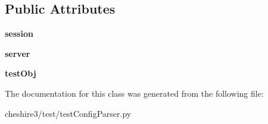 \subsection*{Public Attributes}
\begin{DoxyCompactItemize}
\item 
\hypertarget{classcheshire3_1_1test_1_1test_config_parser_1_1_cheshire3_object_test_case_a4d94f8d488e183ed7338af1a11852bc9}{{\bfseries session}}\label{classcheshire3_1_1test_1_1test_config_parser_1_1_cheshire3_object_test_case_a4d94f8d488e183ed7338af1a11852bc9}

\item 
\hypertarget{classcheshire3_1_1test_1_1test_config_parser_1_1_cheshire3_object_test_case_a20afa13cf8e9644a2ede1eee3f24af9a}{{\bfseries server}}\label{classcheshire3_1_1test_1_1test_config_parser_1_1_cheshire3_object_test_case_a20afa13cf8e9644a2ede1eee3f24af9a}

\item 
\hypertarget{classcheshire3_1_1test_1_1test_config_parser_1_1_cheshire3_object_test_case_ab934604977511d5ede59b9e2051ab3e9}{{\bfseries test\-Obj}}\label{classcheshire3_1_1test_1_1test_config_parser_1_1_cheshire3_object_test_case_ab934604977511d5ede59b9e2051ab3e9}

\end{DoxyCompactItemize}


The documentation for this class was generated from the following file\-:\begin{DoxyCompactItemize}
\item 
cheshire3/test/test\-Config\-Parser.\-py\end{DoxyCompactItemize}
